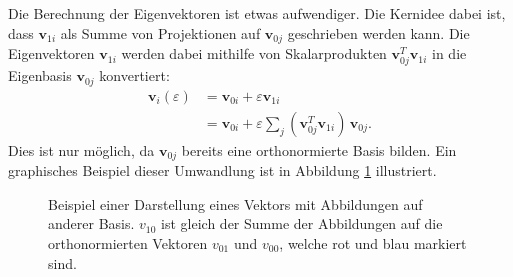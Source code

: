 Die Berechnung der Eigenvektoren ist etwas aufwendiger.
Die Kernidee dabei ist, dass $\bm v_{1i}$ als Summe von Projektionen auf $\bm v_{0j}$ geschrieben werden kann.
%
Die Eigenvektoren $\bm v_{1i}$ werden dabei mithilfe von Skalarprodukten $\bm v_{0j}^T \bm v_{1i}$ in die Eigenbasis $\bm v_{0j}$ konvertiert:
%
%
\begin{align}
    \bm v_i(\varepsilon)
    &=
    \bm v_{0i} + \varepsilon \bm v_{1i} \\
    &=
    \bm v_{0i} + \varepsilon \sum_{j} \left( \bm v_{0j}^T \bm v_{1i} \right) \, \bm v_{0j}.
\end{align}
Dies ist nur möglich, da $\bm v_{0j}$ bereits eine orthonormierte Basis bilden.
Ein graphisches Beispiel dieser Umwandlung ist in Abbildung \ref{ew:fig:scalar_prod} illustriert.
\begin{figure}
    \begin{center}
        
    \end{center}
    \caption[Eigenräume]{
        Beispiel einer Darstellung eines Vektors mit Abbildungen auf anderer Basis.
        $v_{10}$ ist gleich der Summe der Abbildungen auf die orthonormierten Vektoren $v_{01}$ und $v_{00}$, welche rot und blau markiert sind.
    } \label{ew:fig:scalar_prod}
\end{figure}

